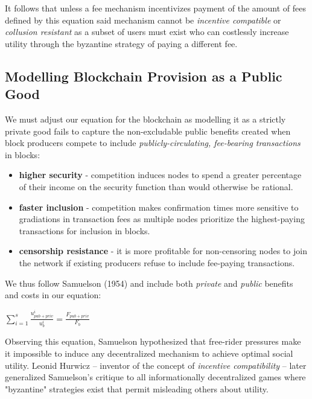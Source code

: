 \documentclass[oneside]{article}   	%
\begin{document}
It follows that unless a fee mechanism incentivizes payment of the amount of fees defined by this equation said mechanism cannot be \textit{incentive compatible} or \textit{collusion resistant} as a subset of users must exist who can costlessly increase utility through the byzantine strategy of paying a different fee.

\subsection*{Modelling Blockchain Provision as a Public Good}

We must adjust our equation for the blockchain as modelling it as a strictly private good fails to capture the non-excludable public benefits created when block producers compete to include \textit{publicly-circulating, fee-bearing transactions} in blocks:

\begin{itemize}
  \item \textbf{higher security} - competition induces nodes to spend a greater percentage of their income on the security function than would otherwise be rational.
  \item \textbf{faster inclusion} - competition makes confirmation times more sensitive to gradiations in transaction fees as multiple nodes prioritize the highest-paying transactions for inclusion in blocks.
  \item \textbf{censorship resistance} - it is more profitable for non-censoring nodes to join the network if existing producers refuse to include fee-paying transactions.
\end{itemize}

We thus follow Samuelson (1954) and include both \textit{private} and \textit{public} benefits and costs in our equation:

\LARGE
\begin{adjustwidth}{1.5em}{1.5em} 
\begin{math}
\sum_{i=1}^{s} \frac{u_{{pub}+{priv}}^i}{u_b^i} = \frac{F_{{pub}+{priv}}}{F_b}
\end{math}
\end{adjustwidth}
\normalsize

Observing this equation, Samuelson hypothesized that free-rider pressures make it impossible to induce any decentralized mechanism to achieve optimal social utility. Leonid Hurwicz -- inventor of the concept of \textit{incentive compatibility} -- later generalized Samuelson's critique to all informationally decentralized games where "byzantine" strategies exist that permit misleading others about utility.
\end{document}
